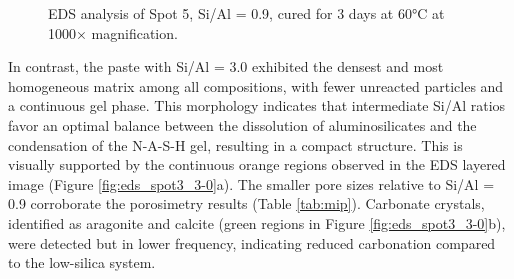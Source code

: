 \begin{figure}[H]
    \centering
    \hfill
    \caption{EDS analysis of Spot 5, Si/Al = 0.9, cured for 3 days at 60°C at 1000× magnification.}
    \label{fig:eds_spot5_0-9}
\end{figure}

In contrast, the paste with Si/Al = 3.0 exhibited the densest and most homogeneous matrix among all compositions, with fewer unreacted particles and a continuous gel phase.
This morphology indicates that intermediate Si/Al ratios favor an optimal balance between the dissolution of aluminosilicates and the condensation of the N-A-S-H gel, resulting in a compact structure.
This is visually supported by the continuous orange regions observed in the EDS layered image (Figure \ref{fig:eds_spot3_3-0}a).
The smaller pore sizes relative to Si/Al = 0.9 corroborate the porosimetry results (Table \ref{tab:mip}).
Carbonate crystals, identified as aragonite and calcite (green regions in Figure \ref{fig:eds_spot3_3-0}b), were detected but in lower frequency, indicating reduced carbonation compared to the low-silica system.


